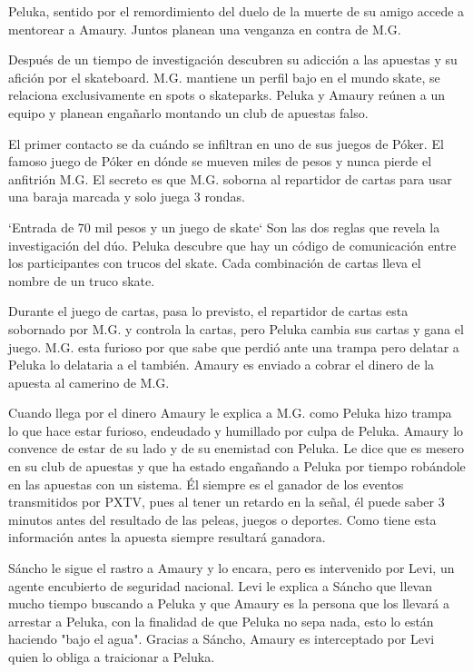 Peluka, sentido por el remordimiento del duelo de la muerte de su amigo accede a mentorear a Amaury. Juntos planean una venganza en contra de M.G.

Después de un tiempo de investigación descubren su adicción a las apuestas y su afición por el skateboard. M.G. mantiene un perfil bajo en el mundo skate, se relaciona exclusivamente en spots o skateparks. Peluka y Amaury reúnen a un equipo y planean engañarlo montando un club de apuestas falso. 

El primer contacto se da cuándo se infiltran en uno de sus juegos de Póker. El famoso juego de Póker en dónde se mueven miles de pesos y nunca pierde el anfitrión M.G. El secreto es que M.G. soborna al repartidor de cartas para usar una baraja marcada y solo juega 3 rondas. 


`Entrada de 70 mil pesos y un juego de skate` Son las dos reglas que revela la investigación del dúo. Peluka descubre que hay un código de comunicación entre los participantes con trucos del skate. Cada combinación de cartas lleva el nombre de un truco skate. 

Durante el juego de cartas, pasa lo previsto, el repartidor de cartas esta sobornado por M.G. y controla la cartas, pero Peluka cambia sus cartas y gana el juego. M.G. esta furioso por que sabe que perdió ante una trampa pero delatar a Peluka lo delataria a el también. Amaury es enviado a cobrar el dinero de la apuesta al camerino de M.G. 

Cuando llega por el dinero Amaury le explica a M.G. como Peluka hizo trampa lo que hace estar furioso, endeudado y humillado por culpa de Peluka. Amaury lo convence de estar de su lado y de su enemistad con Peluka. Le dice que es mesero en su club de apuestas y que ha estado engañando a Peluka por tiempo robándole en las apuestas con un sistema. Él siempre es el ganador de los eventos transmitidos por PXTV, pues al tener un retardo en la señal, él puede saber 3 minutos antes del resultado de las peleas, juegos o deportes. Como tiene esta información antes la apuesta siempre resultará ganadora.

Sáncho le sigue el rastro a Amaury y lo encara, pero es intervenido por Levi, un agente encubierto de seguridad nacional. Levi le explica a Sáncho que llevan mucho tiempo buscando a Peluka y que Amaury es la persona que los llevará a arrestar a Peluka, con la finalidad de que Peluka no sepa nada, esto lo están haciendo "bajo el agua". Gracias a Sáncho, Amaury es interceptado por Levi quien lo obliga a traicionar a Peluka.

